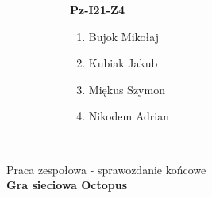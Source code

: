 \begin{titlepage}
  \begin{figure}
    \centering
    \begin{subfigure}{.5\textwidth}
      \textbf{Pz-I21-Z4}
      \begin{enumerate}
        \item Bujok Mikołaj
        \item Kubiak Jakub
        \item Miękus Szymon
        \item Nikodem Adrian
      \end{enumerate}
    \end{subfigure}%
    \begin{subfigure}[t]{.5\textwidth}
      \hfill \raisebox{1.25cm}{ \today}
    \end{subfigure} \\[1.5cm]
  \end{figure}
\begin{center}
  \LARGE{Praca zespołowa - sprawozdanie końcowe} \\[1.0cm]
  \Huge{\textbf{Gra sieciowa Octopus}}
\end{center}
\end{titlepage}
\pagebreak
\setcounter{figure}{0}
